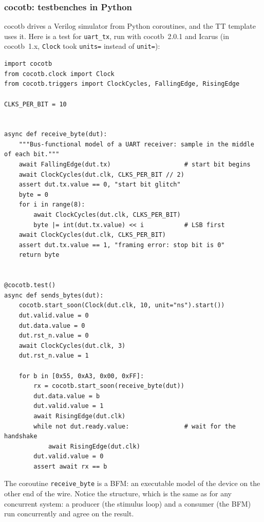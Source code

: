 \subsubsection{cocotb: testbenches in Python}
cocotb drives a Verilog simulator from Python coroutines, and the TT template
uses it. Here is a test for \texttt{uart\_tx}, run with cocotb~2.0.1 and
Icarus (in cocotb~1.x, \texttt{Clock} took \texttt{units=} instead of
\texttt{unit=}):
{\small
\begin{verbatim}
import cocotb
from cocotb.clock import Clock
from cocotb.triggers import ClockCycles, FallingEdge, RisingEdge

CLKS_PER_BIT = 10


async def receive_byte(dut):
    """Bus-functional model of a UART receiver: sample in the middle of each bit."""
    await FallingEdge(dut.tx)                    # start bit begins
    await ClockCycles(dut.clk, CLKS_PER_BIT // 2)
    assert dut.tx.value == 0, "start bit glitch"
    byte = 0
    for i in range(8):
        await ClockCycles(dut.clk, CLKS_PER_BIT)
        byte |= int(dut.tx.value) << i           # LSB first
    await ClockCycles(dut.clk, CLKS_PER_BIT)
    assert dut.tx.value == 1, "framing error: stop bit is 0"
    return byte


@cocotb.test()
async def sends_bytes(dut):
    cocotb.start_soon(Clock(dut.clk, 10, unit="ns").start())
    dut.valid.value = 0
    dut.data.value = 0
    dut.rst_n.value = 0
    await ClockCycles(dut.clk, 3)
    dut.rst_n.value = 1

    for b in [0x55, 0xA3, 0x00, 0xFF]:
        rx = cocotb.start_soon(receive_byte(dut))
        dut.data.value = b
        dut.valid.value = 1
        await RisingEdge(dut.clk)
        while not dut.ready.value:               # wait for the handshake
            await RisingEdge(dut.clk)
        dut.valid.value = 0
        assert await rx == b
\end{verbatim}
}
The coroutine \texttt{receive\_byte} is a BFM: an executable model of the
device on the other end of the wire. Notice the structure, which is the
same as for any concurrent system: a producer (the stimulus loop) and a
consumer (the BFM) run concurrently and agree on the result.


